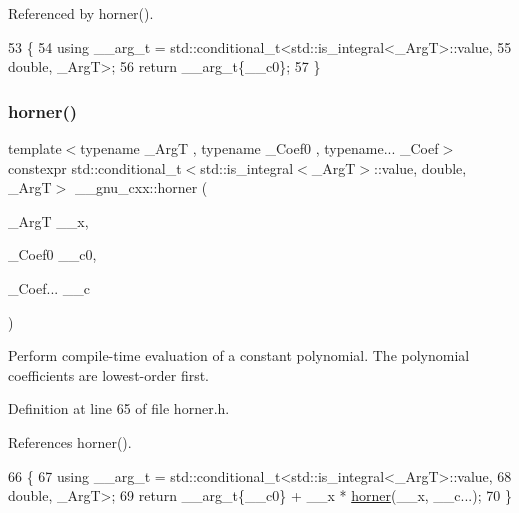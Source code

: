 Referenced by horner().


\begin{DoxyCode}
53   \{
54     \textcolor{keyword}{using} \_\_arg\_t = std::conditional\_t<std::is\_integral<\_ArgT>::value,
55                                         double, \_ArgT>;
56     \textcolor{keywordflow}{return} \_\_arg\_t\{\_\_c0\};
57   \}
\end{DoxyCode}
\mbox{\label{namespace____gnu__cxx_a027e4b11b3b25078522220207c2d7f36}} 
\subsubsection{\texorpdfstring{horner()}{horner()}\hspace{0.1cm}{\footnotesize\ttfamily [2/2]}}
{\footnotesize\ttfamily template$<$typename \+\_\+\+ArgT , typename \+\_\+\+Coef0 , typename... \+\_\+\+Coef$>$ \\
constexpr std\+::conditional\+\_\+t$<$std\+::is\+\_\+integral$<$\+\_\+\+ArgT$>$\+::value, double, \+\_\+\+ArgT$>$ \+\_\+\+\_\+gnu\+\_\+cxx\+::horner (\begin{DoxyParamCaption}\item[{\+\_\+\+ArgT}]{\+\_\+\+\_\+x,  }\item[{\+\_\+\+Coef0}]{\+\_\+\+\_\+c0,  }\item[{\+\_\+\+Coef...}]{\+\_\+\+\_\+c }\end{DoxyParamCaption})}

Perform compile-\/time evaluation of a constant polynomial. The polynomial coefficients are lowest-\/order first. 

Definition at line 65 of file horner.\+h.



References horner().


\begin{DoxyCode}
66   \{
67     \textcolor{keyword}{using} \_\_arg\_t = std::conditional\_t<std::is\_integral<\_ArgT>::value,
68                                         double, \_ArgT>;
69     \textcolor{keywordflow}{return} \_\_arg\_t\{\_\_c0\} + \_\_x * \hyperlink{namespace____gnu__cxx_a027e4b11b3b25078522220207c2d7f36}{horner}(\_\_x, \_\_c...);
70   \}
\end{DoxyCode}
\mbox{\label{namespace____gnu__cxx_af87123557fba351af5069ed8d1b99ec1}} 
